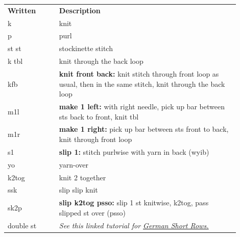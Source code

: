 \documentclass[12pt]{article}
\renewcommand{\arraystretch}{2} %
\begin{document}
\begin{titlingpage}
\begin{multicols}{2}
\begin{center}
{\renewcommand{\arraystretch}{1.5}
\begin{tabular}{| C{0.2\linewidth}  p{0.7\linewidth} | }
\thickhline {} 
 \textbf{Written}	& \textbf{Description} \\ \thickhline
k	&  knit \\
p	& purl   \\
st st 	& stockinette stitch \\
k tbl	& knit through the back loop \\
kfb	& \textbf{knit front back:} knit stitch through front loop as usual, then in the same stitch, knit through the back loop \\
m1l 		& \textbf{make 1 left:} with right needle, pick up bar between sts back to front, knit tbl \\
m1r 		& \textbf{make 1 right:} pick up bar between sts front to back, knit through front loop\\
s1		& \textbf{slip 1:} stitch purlwise with yarn in back (wyib) \\
yo		& yarn-over  \\
k2tog 	& knit 2 together \\
ssk		& slip slip knit \\
sk2p	& \textbf{slip k2tog psso:} slip 1 st knitwise, k2tog, pass slipped st over (psso)\\
double st &	\emph{See this linked tutorial for \href{http://asatricosa.com/german-short-rows/}{\underline{German Short Rows.}}}  \\
\hline
\end{tabular}
} 
\normalsize


\end{center}
\end{multicols}
\end{titlingpage}
\end{document}
